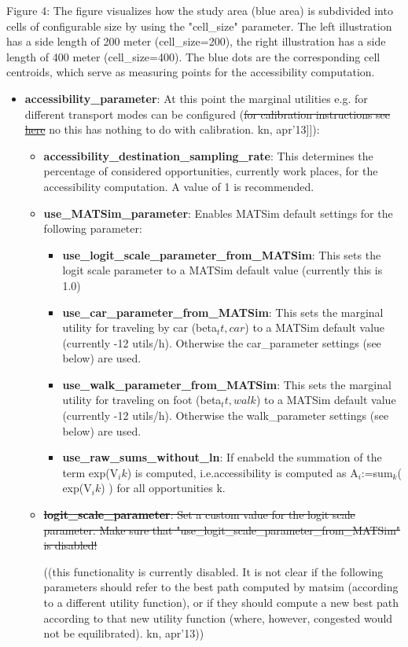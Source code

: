 \documentclass[a4paper,11pt]{report}
\begin{document}
Figure 4: The figure visualizes how the study area (blue area) is  subdivided into cells of configurable size by using the "cell\_size"  parameter. The left illustration has a side length of 200 meter  (cell\_size=200), the right illustration has a side length of 400 meter  (cell\_size=400). The blue dots are the corresponding cell centroids,  which serve as measuring points for the accessibility computation.
\begin{itemize}
	\item \textbf{accessibility\_parameter}: At this point the marginal utilities e.g. for different transport modes can be configured (\sout{for calibration instructions see \href{http://www.matsim.org/node/650}{here}} no this has nothing to do with calibration. kn, apr'13]]):   
\begin{itemize}
	\item \textbf{accessibility\_destination\_sampling\_rate}: This  determines the percentage of considered opportunities, currently work  places, for the accessibility computation. A value of 1 is recommended.
	\item \textbf{use\_MATSim\_parameter}: Enables MATSim default settings for the following parameter:     
\begin{itemize}
	\item \textbf{use\_logit\_scale\_parameter\_from\_MATSim}: This sets the logit scale parameter to a MATSim default value (currently this is 1.0)
	\item \textbf{use\_car\_parameter\_from\_MATSim}: This sets the marginal utility for traveling by car (beta$_tt,car$) to a MATSim default value (currently -12 utils/h). Otherwise the car\_parameter settings (see below) are used.
	\item \textbf{use\_walk\_parameter\_from\_MATSim}: This sets the marginal utility for traveling on foot (beta$_tt,walk$) to a MATSim default value (currently -12 utils/h). Otherwise the walk\_parameter settings (see below) are used.
	\item \textbf{use\_raw\_sums\_without\_ln}: If enabeld the summation of the term exp(V$_ik$) is computed, i.e.accessibility is computed as A$_i$:=sum$_k$( exp(V$_ik$) ) for all opportunities k.
\end{itemize}
	\item \sout{\textbf{logit\_scale\_parameter}: Set a custom value for the logit scale parameter. Make sure that "use\_logit\_scale\_parameter\_from\_MATSim" is disabled!}


((this functionality is currently disabled. It is not clear if the  following parameters should refer to the best path computed by matsim  (according to a different utility function), or if they should compute a  new best path according to that new utility function (where, however,  congested would not be equilibrated). kn, apr'13)) 


\end{itemize}
\end{itemize}
\end{document}
